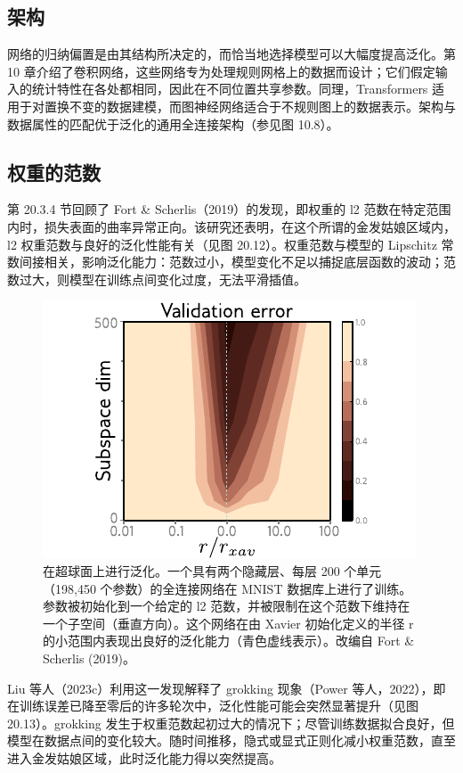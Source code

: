 \documentclass[lang=cn,newtx,10pt,scheme=chinese]{elegantbook}
\begin{document}
\subsection{架构}
网络的归纳偏置是由其结构所决定的，而恰当地选择模型可以大幅度提高泛化。第 10 章介绍了卷积网络，这些网络专为处理规则网格上的数据而设计；它们假定输入的统计特性在各处都相同，因此在不同位置共享参数。同理，Transformers 适用于对置换不变的数据建模，而图神经网络适合于不规则图上的数据表示。架构与数据属性的匹配优于泛化的通用全连接架构（参见图 10.8）。

\subsection{权重的范数}
第 20.3.4 节回顾了 Fort \& Scherlis（2019）的发现，即权重的 l2 范数在特定范围内时，损失表面的曲率异常正向。该研究还表明，在这个所谓的金发姑娘区域内，l2 权重范数与良好的泛化性能有关（见图 20.12）。权重范数与模型的 Lipschitz 常数间接相关，影响泛化能力：范数过小，模型变化不足以捕捉底层函数的波动；范数过大，则模型在训练点间变化过度，无法平滑插值。

\begin{figure}[ht!]
\centering
\includegraphics[width=0.7\linewidth]{PDFFigures/UDLChap21PDF/WhyGoldilocks2.pdf}
\caption{在超球面上进行泛化。一个具有两个隐藏层、每层 200 个单元（198,450 个参数）的全连接网络在 MNIST 数据库上进行了训练。参数被初始化到一个给定的 l2 范数，并被限制在这个范数下维持在一个子空间（垂直方向）。这个网络在由 Xavier 初始化定义的半径 r 的小范围内表现出良好的泛化能力（青色虚线表示）。改编自 Fort \& Scherlis (2019)。}
\end{figure}

Liu 等人（2023c）利用这一发现解释了 grokking 现象（Power 等人，2022），即在训练误差已降至零后的许多轮次中，泛化性能可能会突然显著提升（见图 20.13）。grokking 发生于权重范数起初过大的情况下；尽管训练数据拟合良好，但模型在数据点间的变化较大。随时间推移，隐式或显式正则化减小权重范数，直至进入金发姑娘区域，此时泛化能力得以突然提高。
\end{document}
